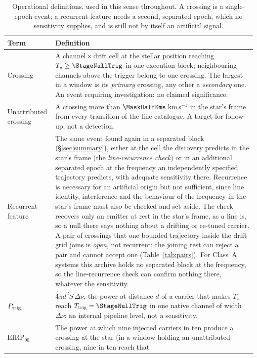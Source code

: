 \begin{table}
\centering
\caption{Operational definitions, used in this sense throughout. A crossing is
a single-epoch event; a recurrent feature needs a second, separated epoch,
which no sensitivity supplies, and is still not by itself an artificial
signal.}
\label{tab:quantities}
\small
\begin{tabular}{@{}p{}p{}@{}}
\hline
Term & Definition \\
\hline
Crossing &
A channel\,$\times$\,drift cell at the stellar position reaching
$T_\star\geq\StageNullTrig$ in one execution block; neighbouring channels
above the trigger belong to one crossing. The largest in a window is its
\emph{primary} crossing, any other a \emph{secondary} one. An event requiring
investigation; no claimed significance. \\
Unattributed crossing &
A crossing more than $\MaskHalfKms$\,km\,s$^{-1}$ in the star's frame from
every transition of the line catalogue. A target for follow-up; not a
detection. \\
Recurrent feature &
The same event found again in a separated block (\S\ref{sec:summary}),
either at the cell the discovery predicts in the star's frame (the
\emph{line-recurrence check}) or in an additional separated epoch at the
frequency an independently specified trajectory predicts, with adequate
sensitivity there. Recurrence is necessary for an artificial origin but not
sufficient, since line identity, interference and the behaviour of the
frequency in the star's frame must also be checked and set aside. The check recovers only an emitter at rest in the star's
frame, as a line is, so a null there says nothing about a drifting or
re-tuned carrier. A pair of crossings that one bounded trajectory inside the drift
grid joins is \emph{open}, not recurrent: the joining test can reject a pair
and cannot accept one (Table~\ref{tab:pairs}). For \ZcNoRepSys{} Class~A
systems this archive holds no separated block at the frequency, so the
line-recurrence check can confirm nothing there, whatever the sensitivity. \\
$P_{\rm trig}$ &
$4\pi d^{2}S\,\Delta\nu$, the power at distance $d$ of a carrier that makes
$T_\star$ reach $T_{\rm trig}=\StageNullTrig$ in one native channel of width
$\Delta\nu$: an internal pipeline level, not a sensitivity. \\
$\mathrm{EIRP}_{90}$ &
The power at which nine injected carriers in ten produce a crossing at the
star (in a window holding an unattributed crossing, nine in ten reach that

\end{tabular}
\end{table}
